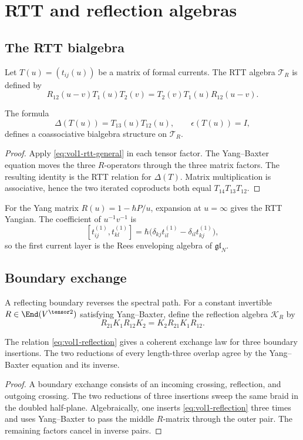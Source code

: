 \chapter{RTT and reflection algebras}
\section{The RTT bialgebra}
Let $T(u)=(t_{ij}(u))$ be a matrix of formal currents.  The RTT algebra $\mathcal T_R$ is defined by
\begin{equation}\label{eq:vol1-rtt-general}
 R_{12}(u-v)T_1(u)T_2(v)
 =T_2(v)T_1(u)R_{12}(u-v).
\end{equation}

\begin{theorem}
The formula
\[
 \Delta(T(u))=T_{13}(u)T_{12}(u),
 \qquad \epsilon(T(u))=I,
\]
defines a coassociative bialgebra structure on $\mathcal T_R$.
\end{theorem}
\begin{proof}
Apply \eqref{eq:vol1-rtt-general} in each tensor factor.  The Yang--Baxter equation moves the three $R$-operators through the three matrix factors.  The resulting identity is the RTT relation for $\Delta(T)$.  Matrix multiplication is associative, hence the two iterated coproducts both equal $T_{14}T_{13}T_{12}$.
\end{proof}

For the Yang matrix $R(u)=1-\hbar P/u$, expansion at $u=\infty$ gives the RTT Yangian.  The coefficient of $u^{-1}v^{-1}$ is
\[
 [t_{ij}^{(1)},t_{kl}^{(1)}]
 =\hbar\bigl(\delta_{kj}t_{il}^{(1)}-\delta_{il}t_{kj}^{(1)}\bigr),
\]
so the first current layer is the Rees enveloping algebra of $\mathfrak{gl}_N$.

\section{Boundary exchange}
A reflecting boundary reverses the spectral path.  For a constant invertible $R\in\End(V^{\tensor2})$ satisfying Yang--Baxter, define the reflection algebra $\mathcal K_R$ by
\begin{equation}\label{eq:vol1-reflection}
 R_{21}K_1R_{12}K_2
 =K_2R_{21}K_1R_{12}.
\end{equation}

\begin{theorem}
The relation \eqref{eq:vol1-reflection} gives a coherent exchange law for three boundary insertions.  The two reductions of every length-three overlap agree by the Yang--Baxter equation and its inverse.
\end{theorem}
\begin{proof}
A boundary exchange consists of an incoming crossing, reflection, and outgoing crossing.  The two reductions of three insertions sweep the same braid in the doubled half-plane.  Algebraically, one inserts \eqref{eq:vol1-reflection} three times and uses Yang--Baxter to pass the middle $R$-matrix through the outer pair.  The remaining factors cancel in inverse pairs.
\end{proof}

